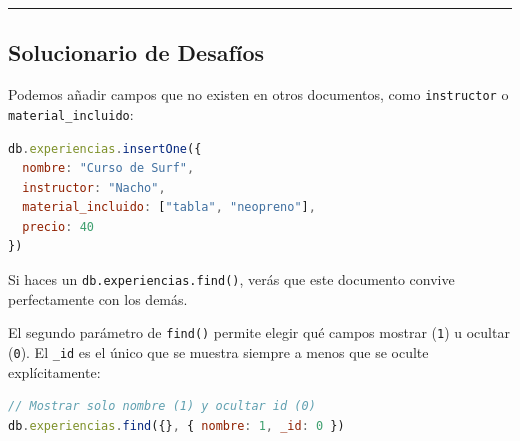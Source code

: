 \documentclass[12pt,a4paper]{article}
\begin{document}
\begin{center}\rule{0.5\linewidth}{0.5pt}\end{center}

\subsection{Solucionario de Desafíos}\label{solucionario-mongodb}

\begin{tcolorbox}[title=Solución Desafío 1: Esquema Flexible]
Podemos añadir campos que no existen en otros documentos, como \texttt{instructor} o \texttt{material\_incluido}:
\begin{lstlisting}[language=JavaScript]
db.experiencias.insertOne({
  nombre: "Curso de Surf",
  instructor: "Nacho",
  material_incluido: ["tabla", "neopreno"],
  precio: 40
})
\end{lstlisting}
Si haces un \texttt{db.experiencias.find()}, verás que este documento convive perfectamente con los demás.
\end{tcolorbox}

\begin{tcolorbox}[title=Solución Desafío 2: Proyecciones]
El segundo parámetro de \texttt{find()} permite elegir qué campos mostrar (\texttt{1}) u ocultar (\texttt{0}). El \texttt{\_id} es el único que se muestra siempre a menos que se oculte explícitamente:
\begin{lstlisting}[language=JavaScript]
// Mostrar solo nombre (1) y ocultar id (0)
db.experiencias.find({}, { nombre: 1, _id: 0 })
\end{lstlisting}
\end{tcolorbox}
\end{document}
